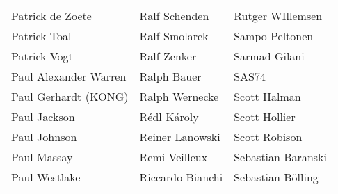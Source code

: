 \begin{tabular}{p{4.5cm}p{4.5cm}p{4.5cm}}
Patrick de Zoete & Ralf Schenden & Rutger WIllemsen \\
Patrick Toal & Ralf Smolarek & Sampo Peltonen \\
Patrick Vogt & Ralf Zenker & Sarmad Gilani \\
Paul Alexander Warren & Ralph Bauer & SAS74 \\
Paul Gerhardt (KONG) & Ralph Wernecke & Scott Halman \\
Paul Jackson & Rédl Károly & Scott Hollier \\
Paul Johnson & Reiner Lanowski & Scott Robison \\
Paul Massay & Remi Veilleux & Sebastian Baranski \\
Paul Westlake & Riccardo Bianchi & Sebastian Bölling \\
\end{tabular}
\newpage
\setlength{\tabcolsep}{1mm}
